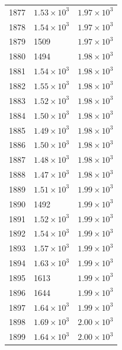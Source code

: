 \begin{table}[H]
\begin{tabular}{lll}
1877 & $\displaystyle 1.53 \times 10^{3}$ & $\displaystyle 1.97 \times 10^{3}$ \\
1878 & $\displaystyle 1.54 \times 10^{3}$ & $\displaystyle 1.97 \times 10^{3}$ \\
1879 & 1509 & $\displaystyle 1.97 \times 10^{3}$ \\
1880 & 1494 & $\displaystyle 1.98 \times 10^{3}$ \\
1881 & $\displaystyle 1.54 \times 10^{3}$ & $\displaystyle 1.98 \times 10^{3}$ \\
1882 & $\displaystyle 1.55 \times 10^{3}$ & $\displaystyle 1.98 \times 10^{3}$ \\
1883 & $\displaystyle 1.52 \times 10^{3}$ & $\displaystyle 1.98 \times 10^{3}$ \\
1884 & $\displaystyle 1.50 \times 10^{3}$ & $\displaystyle 1.98 \times 10^{3}$ \\
1885 & $\displaystyle 1.49 \times 10^{3}$ & $\displaystyle 1.98 \times 10^{3}$ \\
1886 & $\displaystyle 1.50 \times 10^{3}$ & $\displaystyle 1.98 \times 10^{3}$ \\
1887 & $\displaystyle 1.48 \times 10^{3}$ & $\displaystyle 1.98 \times 10^{3}$ \\
1888 & $\displaystyle 1.47 \times 10^{3}$ & $\displaystyle 1.98 \times 10^{3}$ \\
1889 & $\displaystyle 1.51 \times 10^{3}$ & $\displaystyle 1.99 \times 10^{3}$ \\
1890 & 1492 & $\displaystyle 1.99 \times 10^{3}$ \\
1891 & $\displaystyle 1.52 \times 10^{3}$ & $\displaystyle 1.99 \times 10^{3}$ \\
1892 & $\displaystyle 1.54 \times 10^{3}$ & $\displaystyle 1.99 \times 10^{3}$ \\
1893 & $\displaystyle 1.57 \times 10^{3}$ & $\displaystyle 1.99 \times 10^{3}$ \\
1894 & $\displaystyle 1.63 \times 10^{3}$ & $\displaystyle 1.99 \times 10^{3}$ \\
1895 & 1613 & $\displaystyle 1.99 \times 10^{3}$ \\
1896 & 1644 & $\displaystyle 1.99 \times 10^{3}$ \\
1897 & $\displaystyle 1.64 \times 10^{3}$ & $\displaystyle 1.99 \times 10^{3}$ \\
1898 & $\displaystyle 1.69 \times 10^{3}$ & $\displaystyle 2.00 \times 10^{3}$ \\
1899 & $\displaystyle 1.64 \times 10^{3}$ & $\displaystyle 2.00 \times 10^{3}$ \\

\end{tabular}
\end{table}
